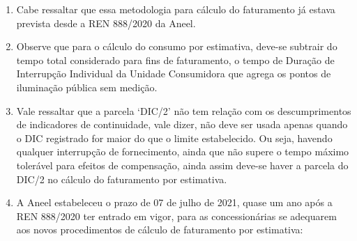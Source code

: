 \begin{enumerate}[resume]
{    Em que,
    \begin{itemize}
        \item Carga = potência nominal total do ponto de iluminação em Watts, incluídos os equipamentos auxiliares, conforme art. 473, devendo ser proporcionalizada em caso de alteração durante o ciclo.
        \item Tempo = tempo considerado para o faturamento diário da iluminação pública, podendo assumir os seguintes valores:
        \begin{itemize}
            \item 24h - para os logradouros que necessitem de iluminação permanente; ou
            \item Tempo médio anual por município homologado no Anexo I da Resolução Homologatória REH nº 2.590, de 13 de agosto de 2019;
        \end{itemize}
        \item DIC = Duração de Interrupção Individual da unidade consumidora que agrega os pontos de iluminação pública no último mês disponível, conforme cronograma de apuração da distribuidora, em horas, conforme Módulo 8 do PRODIST;
        \item n = número de dias do mês ou o número de dias decorridos desde a instalação ou alteração do ponto de iluminação. (grifou-se)
    \end{itemize}
}
\item Cabe ressaltar que essa metodologia para cálculo do faturamento já estava prevista desde a REN 888/2020 da Aneel.
\item Observe que para o cálculo do consumo por estimativa, deve-se subtrair do tempo total considerado para fins de faturamento, o tempo de Duração de Interrupção Individual da Unidade Consumidora que agrega os pontos de iluminação pública sem medição.
\item Vale ressaltar que a parcela ‘DIC/2’ não tem relação com os descumprimentos de indicadores de continuidade, vale dizer, não deve ser usada apenas quando o DIC registrado for maior do que o limite estabelecido. Ou seja, havendo qualquer interrupção de fornecimento, ainda que não supere o tempo máximo tolerável para efeitos de compensação, ainda assim deve-se haver a parcela do DIC/2 no cálculo do faturamento por estimativa.
\item A Aneel estabeleceu o prazo de 07 de julho de 2021, quase um ano após a REN 888/2020 ter entrado em vigor, para as concessionárias se adequarem aos novos procedimentos de cálculo de faturamento por estimativa:
\end{enumerate}
